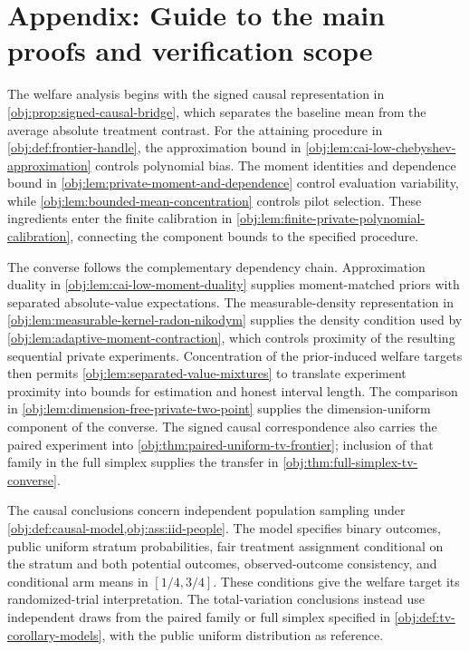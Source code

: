 \section{Appendix: Guide to the main proofs and verification scope}

The welfare analysis begins with the signed causal representation in \cref{obj:prop:signed-causal-bridge}, which separates the baseline mean from the average absolute treatment contrast. For the attaining procedure in \cref{obj:def:frontier-handle}, the approximation bound in \cref{obj:lem:cai-low-chebyshev-approximation} controls polynomial bias. The moment identities and dependence bound in \cref{obj:lem:private-moment-and-dependence} control evaluation variability, while \cref{obj:lem:bounded-mean-concentration} controls pilot selection. These ingredients enter the finite calibration in \cref{obj:lem:finite-private-polynomial-calibration}, connecting the component bounds to the specified procedure.

The converse follows the complementary dependency chain. Approximation duality in \cref{obj:lem:cai-low-moment-duality} supplies moment-matched priors with separated absolute-value expectations. The measurable-density representation in \cref{obj:lem:measurable-kernel-radon-nikodym} supplies the density condition used by \cref{obj:lem:adaptive-moment-contraction}, which controls proximity of the resulting sequential private experiments. Concentration of the prior-induced welfare targets then permits \cref{obj:lem:separated-value-mixtures} to translate experiment proximity into bounds for estimation and honest interval length. The comparison in \cref{obj:lem:dimension-free-private-two-point} supplies the dimension-uniform component of the converse. The signed causal correspondence also carries the paired experiment into \cref{obj:thm:paired-uniform-tv-frontier}; inclusion of that family in the full simplex supplies the transfer in \cref{obj:thm:full-simplex-tv-converse}.

The causal conclusions concern independent population sampling under \cref{obj:def:causal-model,obj:ass:iid-people}. The model specifies binary outcomes, public uniform stratum probabilities, fair treatment assignment conditional on the stratum and both potential outcomes, observed-outcome consistency, and conditional arm means in \([1/4,3/4]\). These conditions give the welfare target its randomized-trial interpretation. The total-variation conclusions instead use independent draws from the paired family or full simplex specified in \cref{obj:def:tv-corollary-models}, with the public uniform distribution as reference.

